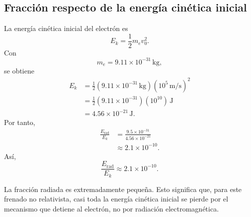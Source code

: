 \documentclass{article}
\numberwithin{equation}{section}
\begin{document}
\subsection{Fracci\'on respecto de la energ\'ia cin\'etica inicial}

La energ\'ia cin\'etica inicial del electr\'on es
\begin{equation*}
  E_k=\frac{1}{2}m_ev_0^2.
\end{equation*}
Con
\begin{equation*}
  m_e=9.11\times10^{-31}\,\mathrm{kg},
\end{equation*}
se obtiene
\begin{align*}
  E_k
  &=\frac{1}{2}(9.11\times10^{-31}\,\mathrm{kg})(10^5\,\mathrm{m/s})^2 \\
  &=\frac{1}{2}(9.11\times10^{-31})(10^{10})\,\mathrm{J} \\
  &=4.56\times10^{-21}\,\mathrm{J}.
\end{align*}
Por tanto,
\begin{align*}
  \frac{E_{\mathrm{rad}}}{E_k}
  &=\frac{9.5\times10^{-31}}{4.56\times10^{-21}} \\
  &\approx2.1\times10^{-10}.
\end{align*}
As\'i,
\begin{equation*}
  \boxed{
  \frac{E_{\mathrm{rad}}}{E_k}\approx2.1\times10^{-10}.
  }
\end{equation*}

La fracci\'on radiada es extremadamente peque\~na. Esto significa que,
para este frenado no relativista, casi toda la energ\'ia cin\'etica inicial se
pierde por el mecanismo que detiene al electr\'on, no por radiaci\'on
electromagn\'etica.
\end{document}
